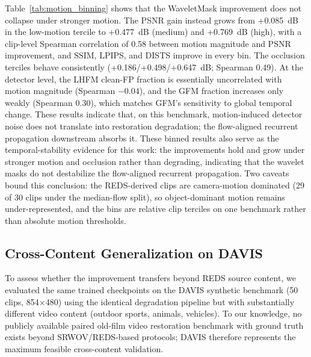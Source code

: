\documentclass[applsci,article,submit,pdftex,moreauthors]{Definitions/mdpi}
\begin{document}
Table~\ref{tab:motion_binning} shows that the WaveletMask improvement does not collapse under stronger motion. The PSNR gain instead grows from +0.085~dB in the low-motion tercile to +0.477~dB (medium) and +0.769~dB (high), with a clip-level Spearman correlation of 0.58 between motion magnitude and PSNR improvement, and SSIM, LPIPS, and DISTS improve in every bin. The occlusion terciles behave consistently (+0.186/+0.498/+0.647~dB; Spearman 0.49). At the detector level, the LHFM clean-FP fraction is essentially uncorrelated with motion magnitude (Spearman $-0.04$), and the GFM fraction increases only weakly (Spearman 0.30), which matches GFM's sensitivity to global temporal change. These results indicate that, on this benchmark, motion-induced detector noise does not translate into restoration degradation; the flow-aligned recurrent propagation downstream absorbs it. These binned results also serve as the temporal-stability evidence for this work: the improvements hold and grow under stronger motion and occlusion rather than degrading, indicating that the wavelet masks do not destabilize the flow-aligned recurrent propagation. Two caveats bound this conclusion: the REDS-derived clips are camera-motion dominated (29 of 30 clips under the median-flow split), so object-dominant motion remains under-represented, and the bins are relative clip terciles on one benchmark rather than absolute motion thresholds.

\subsection{Cross-Content Generalization on DAVIS}\label{subsec:davis}

To assess whether the improvement transfers beyond REDS source content, we evaluated the same trained checkpoints on the DAVIS synthetic benchmark (50 clips, 854$\times$480) using the identical degradation pipeline but with substantially different video content (outdoor sports, animals, vehicles). To our knowledge, no publicly available paired old-film video restoration benchmark with ground truth exists beyond SRWOV/REDS-based protocols; DAVIS therefore represents the maximum feasible cross-content validation.
\end{document}
